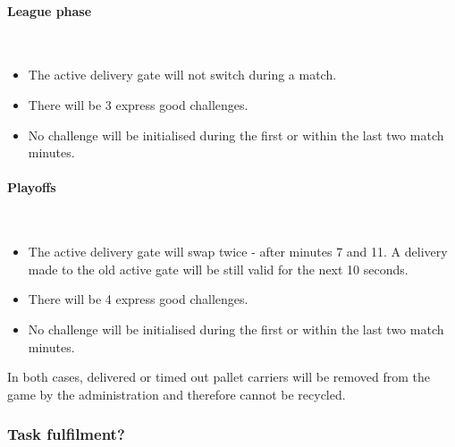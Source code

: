 \documentclass[12pt,twoside]{article}
\begin{document}
\paragraph{League phase}~\\
\begin{itemize}
\item The active delivery gate will not switch during a match.
\item There will be 3 express good challenges.
\item No challenge will be initialised during the first or within the
  last two match minutes.
\end{itemize} 

\paragraph{Playoffs}~\\
\begin{itemize}
\item The active delivery gate will swap twice - after minutes 7
  and 11. A delivery made to the old active gate will be still
  valid for the next 10 seconds.
\item There will be 4 express good challenges. 
\item No challenge will be initialised during the first or within
  the last two match minutes.
\end{itemize}
     

In both cases, delivered or timed out pallet carriers will be removed
from the game by the administration and therefore cannot be recycled.

\subsubsection{Task fulfilment?}
\end{document}
